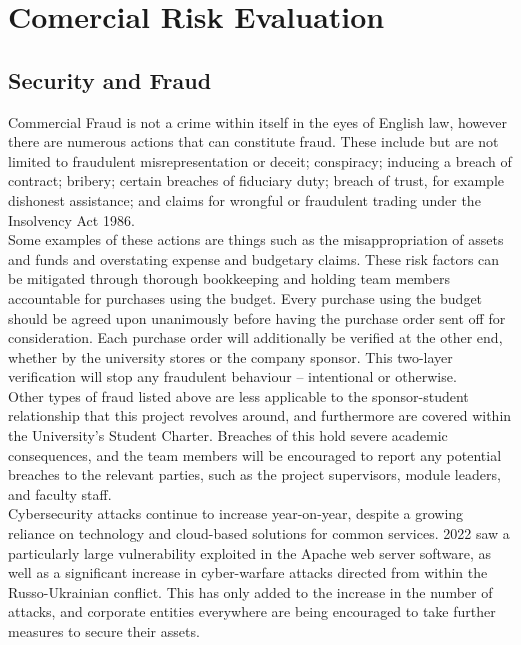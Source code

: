 \documentclass [12pt]{article}
\begin{document}
\section{Comercial Risk Evaluation}\label{sec:Commercial_Risk}

\subsection{Security and Fraud}\label{sec:Security_and_Fraud}

Commercial Fraud is not a crime within itself in the eyes of English law, however there are numerous actions that can constitute fraud. These include but are not limited to fraudulent misrepresentation or deceit; conspiracy; inducing a breach of contract; bribery; certain breaches of fiduciary duty; breach of trust, for example dishonest assistance; and claims for wrongful or fraudulent trading under the Insolvency Act 1986\cite{Fraud_Intro}.
\\
Some examples of these actions are things such as the misappropriation of assets and funds and overstating expense and budgetary claims. These risk factors can be mitigated through thorough bookkeeping and holding team members accountable for purchases using the budget. Every purchase using the budget should be agreed upon unanimously before having the purchase order sent off for consideration. Each purchase order will additionally be verified at the other end, whether by the university stores or the company sponsor. This two-layer verification will stop any fraudulent behaviour – intentional or otherwise.
\\
Other types of fraud listed above are less applicable to the sponsor-student relationship that this project revolves around, and furthermore are covered within the University’s Student Charter. Breaches of this hold severe academic consequences, and the team members will be encouraged to report any potential breaches to the relevant parties, such as the project supervisors, module leaders, and faculty staff.
\\
Cybersecurity attacks continue to increase year-on-year, despite a growing reliance on technology and cloud-based solutions for common services\cite{Checkpoint}. 2022 saw a particularly large vulnerability exploited in the Apache web server software, as well as a significant increase in cyber-warfare attacks directed from within the Russo-Ukrainian conflict. This has only added to the increase in the number of attacks, and corporate entities everywhere are being encouraged to take further measures to secure their assets\cite{Forbes_Cyber_Stats}.
\end{document}
